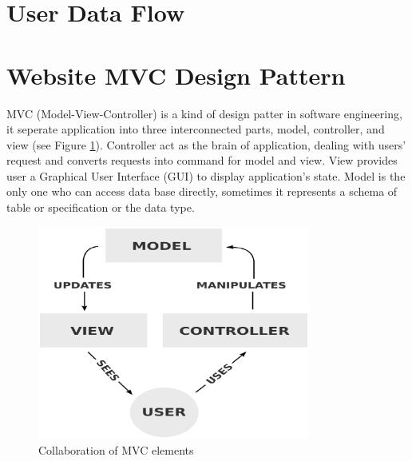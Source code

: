 \section{User Data Flow}

\section{Website MVC Design Pattern}
MVC (Model-View-Controller) is a kind of design patter in software engineering, it seperate application into three interconnected parts, model, controller, and view \cite{Leff2001} (see Figure \ref{fig:mvc}).
Controller act as the brain of application, dealing with users' request and converts requests into command for model and view.
View provides user a Graphical User Interface (GUI) to display application's state.
Model is the only one who can access data base directly, sometimes it represents a schema of table or specification or the data type.

\begin{figure}[H]
    \centering
    \includegraphics[width = 0.8\textwidth]{fig/mvc-relation.eps}
    \caption{Collaboration of MVC elements}
    \label{fig:mvc}
\end{figure}
